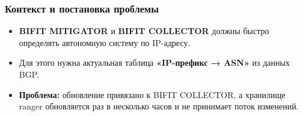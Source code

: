 \begin{frame}\frametitle{Контекст и постановка проблемы}
\begin{itemize}\setlength{\itemsep}{0.45em}
  \item \textbf{BIFIT MITIGATOR} и \textbf{BIFIT COLLECTOR} должны быстро
  определять автономную систему по IP-адресу.
  \item Для этого нужна актуальная таблица
  \textbf{«IP-префикс → ASN»} из данных BGP.
  \item \textbf{Проблема:} обновление привязано к BIFIT COLLECTOR, а
  хранилище ranger обновляется раз в несколько часов и не принимает поток
  изменений.
\end{itemize}
\end{frame}
